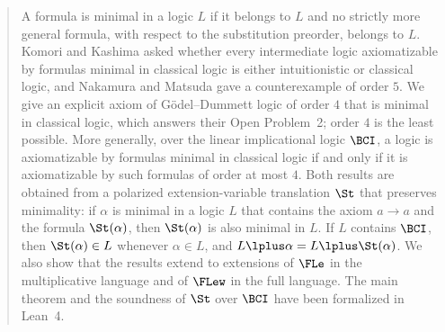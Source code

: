 \begin{abstract}
A formula is minimal in a logic $L$ if it belongs to $L$ and no strictly
more general formula, with respect to the substitution preorder, belongs to
$L$. Komori and Kashima asked whether every intermediate logic
axiomatizable by formulas minimal in classical logic is either
intuitionistic or classical logic, and Nakamura and Matsuda gave a
counterexample of order $5$. We give an explicit axiom of Gödel--Dummett
logic of order $4$ that is minimal in classical logic, which answers their
Open Problem~2; order $4$ is the least possible. More generally, over the
linear implicational logic $\BCI$, a logic is axiomatizable by formulas
minimal in classical logic if and only if it is axiomatizable by such
formulas of order at most $4$. Both results are obtained from a polarized
extension-variable translation $\St$ that preserves minimality: if
$\alpha$ is minimal in a logic $L$ that contains the axiom $a\to a$ and
the formula $\St(\alpha)$, then $\St(\alpha)$ is also minimal in $L$.
If $L$ contains $\BCI$, then $\St(\alpha)\in L$ whenever $\alpha\in L$, and
$L\lplus \alpha=L\lplus \St(\alpha)$. We also show that the results extend to
extensions of $\FLe$ in the multiplicative language and of $\FLew$ in the
full language. The main theorem and the soundness of $\St$ over $\BCI$
have been formalized in Lean~4.
\end{abstract}
